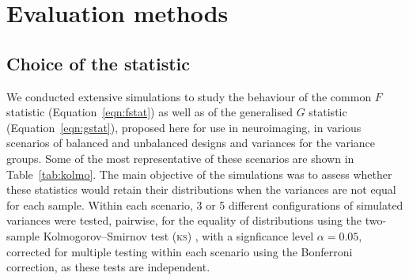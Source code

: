 \section{Evaluation methods}

\subsection{Choice of the statistic}
\label{sec:method_statistic}

We conducted extensive simulations to study the behaviour of the common $F$ statistic (Equation~\ref{eqn:fstat}) as well as of the generalised $G$ statistic (Equation~\ref{eqn:gstat}), proposed here for use in neuroimaging, in various scenarios of balanced and unbalanced designs and variances for the variance groups. Some of the most representative of these scenarios are shown in Table~\ref{tab:kolmo}. The main objective of the simulations was to assess whether these statistics would retain their distributions when the variances are not equal for each sample. Within each scenario, 3 or 5 different configurations of simulated variances were tested, pairwise, for the equality of distributions using the two-sample Kolmogorov--Smirnov test (\textsc{ks}) \citep{Press1992}, with a signficance level $\alpha = 0.05$, corrected for multiple testing within each scenario using the Bonferroni correction, as these tests are independent.

